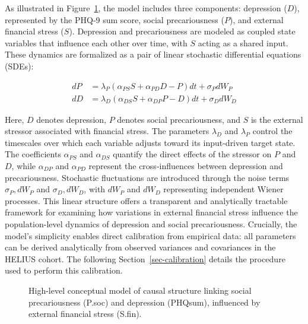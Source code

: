 \documentclass[
]{article}
\begin{document}
As illustrated in Figure~\ref{fig-concept}, the model includes three
components: depression (\(D\)), represented by the PHQ-9 sum score,
social precariousness (\(P\)), and external financial stress (\(S\)).
Depression and precariousness are modeled as coupled state variables
that influence each other over time, with \(S\) acting as a shared
input. These dynamics are formalized as a pair of linear stochastic
differential equations (SDEs):

\[
\begin{aligned}
dP &= \lambda_P \left(\alpha_{PS} S + \alpha_{PD} D - P \right) dt + \sigma_{P} dW_{P} \\
dD &= \lambda_D \left(\alpha_{DS} S + \alpha_{DP} P - D \right) dt + \sigma_{D} dW_{D} 
\end{aligned}
\]

Here, \(D\) denotes depression, \(P\) denotes social precariousness, and
\(S\) is the external stressor associated with financial stress. The
parameters \(\lambda_D\) and \(\lambda_P\) control the timescales over
which each variable adjusts toward its input-driven target state. The
coefficients \(\alpha_{PS}\) and \(\alpha_{DS}\) quantify the direct
effects of the stressor on \(P\) and \(D\), while \(\alpha_{DP}\) and
\(\alpha_{PD}\) represent the cross-influences between depression and
precariousness. Stochastic fluctuations are introduced through the noise
terms \(\sigma_P, dW_P\) and \(\sigma_D, dW_D\), with \(dW_P\) and
\(dW_D\) representing independent Wiener processes. This linear
structure offers a transparent and analytically tractable framework for
examining how variations in external financial stress influence the
population-level dynamics of depression and social precariousness.
Crucially, the model's simplicity enables direct calibration from
empirical data: all parameters can be derived analytically from observed
variances and covariances in the HELIUS cohort. The following
Section~\ref{sec-calibration} details the procedure used to perform this
calibration.

\begin{figure}


\caption{\label{fig-concept}High-level conceptual model of causal
structure linking social precariousness (P.soc) and depression (PHQsum),
influenced by external financial stress (S.fin).}

\end{figure}%
\end{document}
